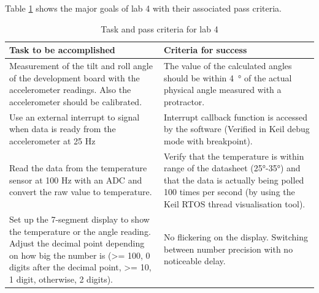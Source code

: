 ﻿\documentclass[12pt]{article}
\begin{document}
Table \ref{Table_tasks} shows the major goals of lab 4 with their associated pass criteria.
\begin{table}[!h]
\centering
\caption{Task and pass criteria for lab 4}
\label{Table_tasks}
\begin{tabular}{|p{0.5\linewidth}|p{0.5\linewidth}|}
\hline
\textbf{Task to be accomplished}                                                                                                                                                                                                              & \textbf{Criteria for success}                                                                                                                                                                                            \\ \hline
Measurement of the tilt and roll angle of the development board with the accelerometer readings. Also the accelerometer should be calibrated.                                                                                                 & The value of the calculated angles should be within \SI{4}{\degree} of the actual physical angle measured with a protractor.                                                                                                          \\ \hline
Use an external interrupt to signal when data is ready from the accelerometer at 25 Hz                                                                                                                                                       & Interrupt callback function is accessed by the software (Verified in Keil debug mode with breakpoint).                                                                                                                   \\ \hline
Read the data from the temperature sensor at 100 Hz with an ADC and convert the raw value to temperature.                                                                                                                                     & Verify that the temperature is within range of the datasheet (25°-35°) and that the data is actually being polled 100 times per second (by using the Keil RTOS thread visualisation tool).                               \\ \hline
Set up the 7-segment display to show the temperature or the angle reading. Adjust the decimal point depending on how big the number is (\textgreater= 100, 0 digits after the decimal point, \textgreater= 10, 1 digit, otherwise, 2 digits). & No flickering on the display. Switching between number precision with no noticeable delay.                                                                                                                               \\ \hline

\end{tabular}
\end{table}
\end{document}
